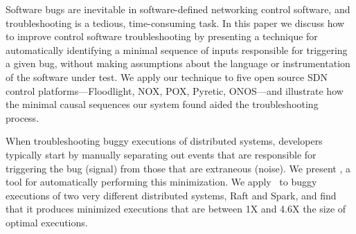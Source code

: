 Software bugs are inevitable in software-defined networking control software,
and troubleshooting
is a tedious, time-consuming task. In this paper we discuss how to improve
control software troubleshooting by presenting a technique
for automatically identifying
a minimal sequence of inputs responsible for triggering a given bug, without
making assumptions about the language or instrumentation of the software under
test. We apply our technique to five open source SDN control
platforms---Floodlight, NOX, POX, Pyretic, ONOS---and
illustrate how the minimal causal sequences our system found aided the
troubleshooting process.

When troubleshooting buggy executions of distributed systems, developers typically
start by manually separating out events that are responsible for triggering the bug (signal) from those that are extraneous (noise).
We present \sys, a tool for automatically performing this minimization.
We apply \sys~to buggy executions of two very different distributed systems,
Raft and Spark, and find that it produces minimized executions that are
between 1X and 4.6X the size of optimal executions.
